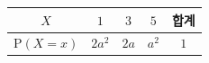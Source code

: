 {\setlength{\tabcolsep}{7pt}\renewcommand{\arraystretch}{1.35}%
\begin{tabular}{|c|c|c|c|c|}
\hline
$X$ & $1$ & $3$ & $5$ & \textbf{합계} \\
\hline
$\mathrm{P}(X=x)$ & $2a^2$ & $2a$ & $a^2$ & $1$ \\
\hline
\end{tabular}}
